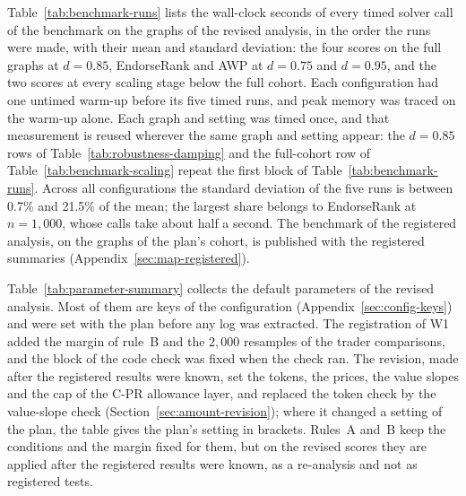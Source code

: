 
Table~\ref{tab:benchmark-runs} lists the wall-clock seconds of every timed solver call of the benchmark on the graphs of the revised analysis, in the order the runs were made, with their mean and standard deviation: the four scores on the full graphs at $d=0.85$, EndorseRank and AWP at $d=0.75$ and $d=0.95$, and the two scores at every scaling stage below the full cohort. Each configuration had one untimed warm-up before its five timed runs, and peak memory was traced on the warm-up alone. Each graph and setting was timed once, and that measurement is reused wherever the same graph and setting appear: the $d=0.85$ rows of Table~\ref{tab:robustness-damping} and the full-cohort row of Table~\ref{tab:benchmark-scaling} repeat the first block of Table~\ref{tab:benchmark-runs}. Across all configurations the standard deviation of the five runs is between 0.7\% and 21.5\% of the mean; the largest share belongs to EndorseRank at $n=1{,}000$, whose calls take about half a second. The benchmark of the registered analysis, on the graphs of the plan's cohort, is published with the registered summaries (Appendix~\ref{sec:map-registered}).




Table~\ref{tab:parameter-summary} collects the default parameters of the revised analysis. Most of them are keys of the configuration (Appendix~\ref{sec:config-keys}) and were set with the plan before any log was extracted. The registration of W1 added the margin of rule~B and the $2{,}000$ resamples of the trader comparisons, and the block of the code check was fixed when the check ran. The revision, made after the registered results were known, set the tokens, the prices, the value slopes and the cap of the C-PR allowance layer, and replaced the token check by the value-slope check (Section~\ref{sec:amount-revision}); where it changed a setting of the plan, the table gives the plan's setting in brackets. Rules~A and~B keep the conditions and the margin fixed for them, but on the revised scores they are applied after the registered results were known, as a re-analysis and not as registered tests.

